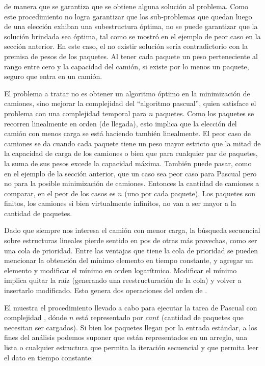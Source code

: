 \documentclass[11pt, a4paper, twoside]{article}
\begin{document}
de manera que se garantiza que se obtiene alguna solución al problema.
Como este procedimiento no logra garantizar que los sub-problemas
que quedan luego de una elección exhiban una subestructura óptima, no se
puede garantizar que la solución brindada sea óptima,
tal como se mostró en el ejemplo de peor caso en la sección anterior.
En este caso, el no existir solución sería contradictorio con
la premisa de pesos de los paquetes. Al tener cada paquete un peso perteneciente al
rango entre cero y la capacidad del camión, si existe por lo menos un paquete, seguro
que entra en un camión.

El problema a tratar no es obtener un algoritmo óptimo en la minimización
de camiones, sino mejorar la complejidad del \enquote{algoritmo pascual},
quien satisface el problema con una complejidad temporal   para $n$ paquetes.
Como los paquetes se recorren linealmente en orden (de llegada), esto implica
que la elección del camión con menos carga se está haciendo también linealmente.
El peor caso de camiones se da cuando cada paquete tiene un peso mayor estricto
que la mitad de la capacidad de carga de los camiones o bien que para cualquier
par de paquetes, la suma de sus pesos excede la capacidad máxima. También puede pasar,
como en el ejemplo de la sección anterior, que un caso sea peor caso para Pascual
pero no para la posible minimización de camiones. Entonces la cantidad
de camiones a comparar, en el peor de los casos es $n$ (uno por cada paquete). 
Los paquetes son finitos, los camiones si bien virtualmente infinitos, no
van a ser mayor a la cantidad de paquetes.

Dado que siempre nos interesa el camión con menor carga, la búsqueda
secuencial sobre estructuras lineales pierde sentido en pos de otras más provechas, como ser
una cola de prioridad. Entre las ventajas que tiene la cola de prioridad
se pueden mencionar la obtención del mínimo elemento en tiempo constante,
y agregar un elemento y modificar el mínimo en orden logarítmico.
Modificar el mínimo implica quitar la raíz (generando una reestructuración de la cola)
y volver a insertarlo modificado. Esto genera dos operaciones del orden de .

El  muestra el procedimiento llevado a cabo para ejecutar la tarea de Pascual
con complejidad , dónde $n$ está representado por $cant$ (cantidad de paquetes
que necesitan ser cargados). Si bien los paquetes llegan por la entrada estándar, a los fines
del análisis podemos suponer que están representados en un arreglo, una lista o cualquier estructura
que permita la iteración secuencial y que permita leer el dato en tiempo constante.
\end{document}
